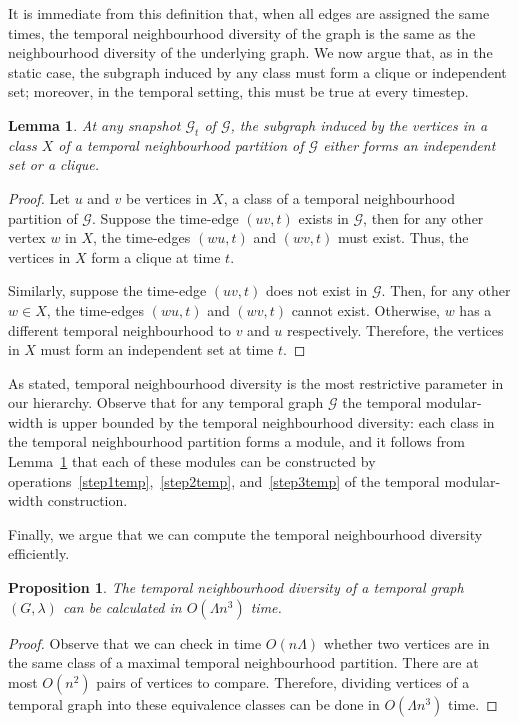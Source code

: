 \documentclass[preprint,12pt]{elsarticle}
\newtheorem{prop}{Proposition}
\newtheorem{lemma}{Lemma}
\begin{document}
It is immediate from this definition that, when all edges are assigned the same times, the temporal neighbourhood diversity of the graph is the same as the neighbourhood diversity of the underlying graph.  We now argue that, as in the static case, the subgraph induced by any class must form a clique or independent set; moreover, in the temporal setting, this must be true at every timestep.

\begin{lemma}\label{lem:class-ind-clique}
    At any snapshot $\mathcal{G}_t$ of $\mathcal{G}$, the subgraph induced by the vertices in a class $X$ of a temporal neighbourhood partition of $\mathcal{G}$ either forms an independent set or a clique.
\end{lemma}
\begin{proof}
    Let $u$ and $v$ be vertices in $X$, a class of a temporal neighbourhood partition of $\mathcal{G}$. Suppose the time-edge $(uv,t)$ exists in $\mathcal{G}$, then for any other vertex $w$ in $X$, the time-edges $(wu,t)$ and $(wv,t)$ must exist. Thus, the vertices in $X$ form a clique at time $t$.
    
    Similarly, suppose the time-edge $(uv,t)$ does not exist in $\mathcal{G}$. Then, for any other $w\in X$, the time-edges $(wu,t)$ and $(wv,t)$ cannot exist. Otherwise, $w$ has a different temporal neighbourhood to $v$ and $u$ respectively. Therefore, the vertices in $X$ must form an independent set at time $t$.
\end{proof}

As stated, temporal neighbourhood diversity is the most restrictive parameter in our hierarchy. Observe that for any temporal graph $\mathcal{G}$ the temporal modular-width is upper bounded by the temporal neighbourhood diversity: each class in the temporal neighbourhood partition forms a module, and it follows from Lemma~\ref{lem:class-ind-clique} that each of these modules can be constructed by operations~\ref{step1temp},~\ref{step2temp}, and~\ref{step3temp} of the temporal modular-width construction.

Finally, we argue that we can compute the temporal neighbourhood diversity efficiently. 

\begin{prop}\label{prop:poly-tnd}
    The temporal neighbourhood diversity of a temporal graph $(G,\lambda)$ can be calculated in $O(\Lambda n^3)$ time.
\end{prop}
\begin{proof}
    Observe that we can check in time $O(n\Lambda)$ whether two vertices are in the same class of a maximal temporal neighbourhood partition. There are at most $O(n^2)$ pairs of vertices to compare. Therefore, dividing vertices of a temporal graph into these equivalence classes can be done in $O(\Lambda n^3)$ time.
\end{proof}
\end{document}
